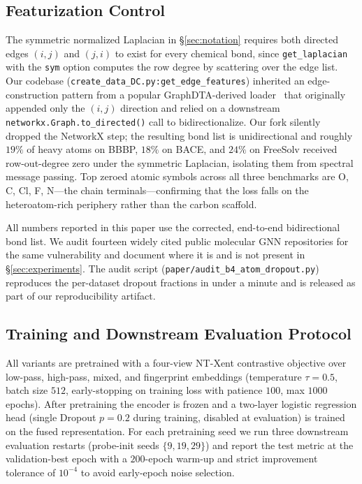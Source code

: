 \subsection{Featurization Control}
\label{sec:featurization-control}
The symmetric normalized Laplacian in \S\ref{sec:notation} requires both
directed edges $(i,j)$ and $(j,i)$ to exist for every chemical bond, since
\texttt{get\_laplacian} with the \texttt{sym} option computes the row
degree by scattering over the edge list. Our codebase
(\texttt{create\_data\_DC.py:get\_edge\_features}) inherited an
edge-construction pattern from a popular GraphDTA-derived
loader~\cite{nguyen2021graphdta} that originally appended only the
$(i,j)$ direction and relied on a downstream
\texttt{networkx.Graph.to\_directed()} call to bidirectionalize. Our fork
silently dropped the NetworkX step; the resulting bond list is
unidirectional and roughly $19\%$ of heavy atoms on BBBP,
$18\%$ on BACE, and $24\%$ on FreeSolv received row-out-degree zero
under the symmetric Laplacian, isolating them from spectral message
passing. Top zeroed atomic symbols across all three benchmarks are
O, C, Cl, F, N---the chain terminals---confirming that the loss falls on
the heteroatom-rich periphery rather than the carbon scaffold.

All numbers reported in this paper use the corrected, end-to-end
bidirectional bond list. We audit fourteen widely cited public molecular
GNN repositories for the same vulnerability and document where it is and
is not present in \S\ref{sec:experiments}. The audit script
(\texttt{paper/audit\_b4\_atom\_dropout.py}) reproduces the per-dataset
dropout fractions in under a minute and is released as part of our
reproducibility artifact.

\subsection{Training and Downstream Evaluation Protocol}
\label{sec:training}
All variants are pretrained with a four-view NT-Xent contrastive
objective over low-pass, high-pass, mixed, and fingerprint embeddings
(temperature $\tau{=}0.5$, batch size $512$, early-stopping on training
loss with patience $100$, max $1000$ epochs). After pretraining the
encoder is frozen and a two-layer logistic regression head (single Dropout
$p{=}0.2$ during training, disabled at evaluation) is trained on the fused
representation. For each pretraining seed we run three downstream
evaluation restarts (probe-init seeds $\{9,19,29\}$) and report the
test metric at the validation-best epoch with a $200$-epoch warm-up and
strict improvement tolerance of $10^{-4}$ to avoid early-epoch noise
selection.
